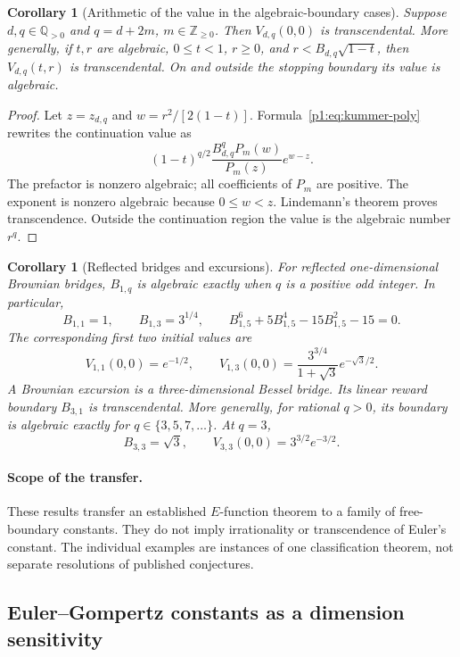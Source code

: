 \documentclass[11pt,a4paper]{article}
\newtheorem{corollary}[theorem]{Corollary}
\theoremstyle{definition}
\theoremstyle{remark}
\numberwithin{equation}{section}
\begin{document}
\begin{corollary}[Arithmetic of the value in the algebraic-boundary cases]
\label{p1:cor:bessel-value-arithmetic}
Suppose $d,q\in\mathbb Q_{>0}$ and $q=d+2m$, $m\in\mathbb Z_{\ge0}$.
Then $V_{d,q}(0,0)$ is transcendental. More generally, if $t,r$ are
algebraic, $0\le t<1$, $r\ge0$, and
$r<B_{d,q}\sqrt{1-t}$, then $V_{d,q}(t,r)$ is transcendental.
On and outside the stopping boundary its value is algebraic.
\end{corollary}
\begin{proof}
Let $z=z_{d,q}$ and $w=r^2/[2(1-t)]$. Formula~\eqref{p1:eq:kummer-poly}
rewrites the continuation value as
\[
 (1-t)^{q/2}\frac{B_{d,q}^qP_m(w)}{P_m(z)}e^{w-z}.
\]
The prefactor is nonzero algebraic; all coefficients of $P_m$ are
positive. The exponent is nonzero algebraic because $0\le w<z$.
Lindemann's theorem proves transcendence. Outside the continuation
region the value is the algebraic number $r^q$.
\end{proof}

\begin{corollary}[Reflected bridges and excursions]
For reflected one-dimensional Brownian bridges, $B_{1,q}$ is
algebraic exactly when $q$ is a positive odd integer. In particular,
\[
 B_{1,1}=1,\qquad B_{1,3}=3^{1/4},\qquad
 B_{1,5}^{6}+5B_{1,5}^{4}-15B_{1,5}^{2}-15=0.
\]
The corresponding first two initial values are
\[
 V_{1,1}(0,0)=e^{-1/2},\qquad
 V_{1,3}(0,0)=
 \frac{3^{3/4}}{1+\sqrt3}e^{-\sqrt3/2}.
\]
A Brownian excursion is a three-dimensional Bessel bridge. Its linear
reward boundary $B_{3,1}$ is transcendental. More generally, for
rational $q>0$, its boundary is algebraic exactly for
$q\in\{3,5,7,\ldots\}$. At $q=3$,
\[
 B_{3,3}=\sqrt3,\qquad V_{3,3}(0,0)=3^{3/2}e^{-3/2}.
\]
\end{corollary}

\paragraph{Scope of the transfer.}
These results transfer an established $E$-function theorem to a family
of free-boundary constants. They do not imply irrationality or
transcendence of Euler's constant. The individual examples are
instances of one classification theorem, not separate resolutions of
published conjectures.


\subsection{Euler--Gompertz constants as a dimension sensitivity}
\label{p1:subsec:dimension-sensitivity}
\end{document}
